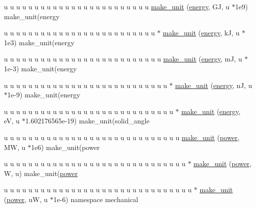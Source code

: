 \begin{DoxyCompactItemize}
\item 
u u u u u u u u u u u u u u u u u u u u u u u u \hyperlink{namespacemui_1_1dim_aff0dcea680553ca5c027b02572f28fe6}{make\+\_\+unit} (\hyperlink{namespacemui_1_1dim_a00e1931b1f70586e0983e317bfafb793}{energy}, GJ, u $\ast$1e9) make\+\_\+unit(energy
\item 
u u u u u u u u u u u u u u u u u u u u u u u u u $\ast$ \hyperlink{namespacemui_1_1dim_a63f442cf28c60a5595b978416da9ccaf}{make\+\_\+unit} (\hyperlink{namespacemui_1_1dim_a00e1931b1f70586e0983e317bfafb793}{energy}, kJ, u $\ast$1e3) make\+\_\+unit(energy
\item 
u u u u u u u u u u u u u u u u u u u u u u u u u u \hyperlink{namespacemui_1_1dim_af538baf85825dd4b43772c19d991a825}{make\+\_\+unit} (\hyperlink{namespacemui_1_1dim_a00e1931b1f70586e0983e317bfafb793}{energy}, mJ, u $\ast$1e-\/3) make\+\_\+unit(energy
\item 
u u u u u u u u u u u u u u u u u u u u u u u u u u u $\ast$ \hyperlink{namespacemui_1_1dim_af4083a3d8e23a34c5c018bb7f15afd6c}{make\+\_\+unit} (\hyperlink{namespacemui_1_1dim_a00e1931b1f70586e0983e317bfafb793}{energy}, nJ, u $\ast$1e-\/9) make\+\_\+unit(energy
\item 
u u u u u u u u u u u u u u u u u u u u u u u u u u u u $\ast$ \hyperlink{namespacemui_1_1dim_a301672a0f7b729e69ea33f948ed4131e}{make\+\_\+unit} (\hyperlink{namespacemui_1_1dim_a00e1931b1f70586e0983e317bfafb793}{energy}, eV, u $\ast$1.\+602176565e-\/19) make\+\_\+unit(solid\+\_\+angle
\item 
u u u u u u u u u u u u u u u u u u u u u u u u u u u u u \hyperlink{namespacemui_1_1dim_a9cab119661a9fd528eb7eec0f1144aff}{make\+\_\+unit} (\hyperlink{namespacemui_1_1dim_a055b2b3b59399dc93eeb974aef05b85b}{power}, MW, u $\ast$1e6) make\+\_\+unit(power
\item 
u u u u u u u u u u u u u u u u u u u u u u u u u u u u u u $\ast$ \hyperlink{namespacemui_1_1dim_a090da23fc88e192dd85bf8d9a14cf3df}{make\+\_\+unit} (\hyperlink{namespacemui_1_1dim_a055b2b3b59399dc93eeb974aef05b85b}{power}, W, u) make\+\_\+unit(\hyperlink{namespacemui_1_1dim_a055b2b3b59399dc93eeb974aef05b85b}{power}
\item 
u u u u u u u u u u u u u u u u u u u u u u u u u u u u u u u $\ast$ \hyperlink{namespacemui_1_1dim_af69c0e5bad5fb33a07c5e0ebe6ca3a6b}{make\+\_\+unit} (\hyperlink{namespacemui_1_1dim_a055b2b3b59399dc93eeb974aef05b85b}{power}, uW, u $\ast$1e-\/6) namespace mechanical
\end{DoxyCompactItemize}
